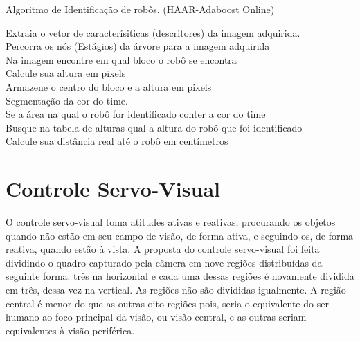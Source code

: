 \begin{algorithm}

\caption{Algoritmo de Identificação de robôs. (HAAR-Adaboost Online)}\label{lst:algHaarOn}



{

Extraia o vetor de caracterísiticas (descritores) da imagem adquirida.\\
Percorra os nós (Estágios) da árvore para a imagem adquirida\\

	{
		Na imagem encontre em qual bloco o robô se encontra\\

		Calcule sua altura em pixels\\

		Armazene o centro do bloco e a altura em pixels\\

		Segmentação da cor do time.\\

		Se a área na qual o robô for identificado conter a cor do time\\

		Busque na tabela de alturas qual a altura do robô que foi identificado\\

		Calcule sua distância real até o robô em centímetros\\
	}
}


\end{algorithm}

\pagebreak

\section{Controle Servo-Visual}
\label{Servo}

O controle servo-visual toma atitudes ativas e reativas, procurando os objetos quando não estão em seu campo de visão, de forma ativa, e seguindo-os, de forma reativa, quando estão à vista. A proposta do controle servo-visual foi feita dividindo o quadro capturado pela câmera em nove regiões distribuídas da seguinte forma: três na horizontal e cada uma dessas regiões é novamente dividida em três, dessa vez na vertical. As regiões não são divididas igualmente. A região central é menor do que as outras oito regiões pois, seria o equivalente do ser humano ao foco principal da visão, ou visão central, e as outras seriam equivalentes à visão periférica.

